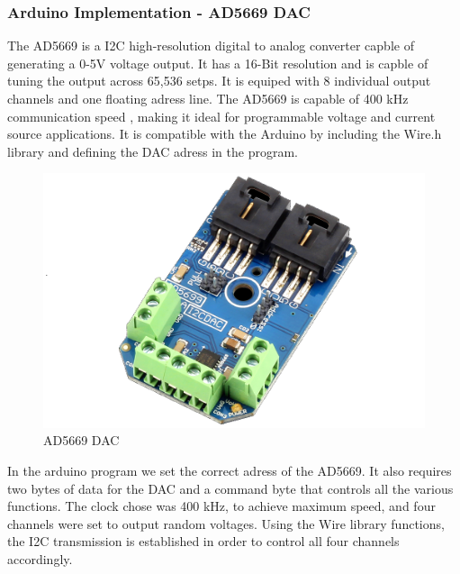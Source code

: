 \begin{refsection}
	\subsubsection{Arduino Implementation - AD5669 DAC}
	
	The AD5669 is a I2C high-resolution digital to analog converter capble of generating a 0-5V voltage output. It has a 16-Bit resolution and is capble of tuning the output across 65,536 setps. It is equiped with 8 individual output channels and one floating adress line. The AD5669 is capable of 400 kHz communication speed , making it ideal for programmable voltage and current source applications. It is compatible with the Arduino by including the Wire.h library and defining the DAC adress in the program.
	
		\begin{figure}[H]
		
		\centering
		\includegraphics[width=0.6\linewidth]{./sdf/arduino_quantum_rx/figures/dac2.png}
		\caption{AD5669 DAC}
		\label{fig:netxpto}
		
	 \end{figure}
	
   In the arduino program we set the correct adress of the AD5669. It also requires two bytes of data for the DAC and a command byte that controls all the various functions. The clock chose was 400 kHz, to achieve maximum speed, and four channels were set to output random voltages. Using the Wire library functions, the I2C transmission is established in order to control all four channels accordingly.
   
   \begin{figure}[H]
   	

\end{figure}
\end{refsection}
